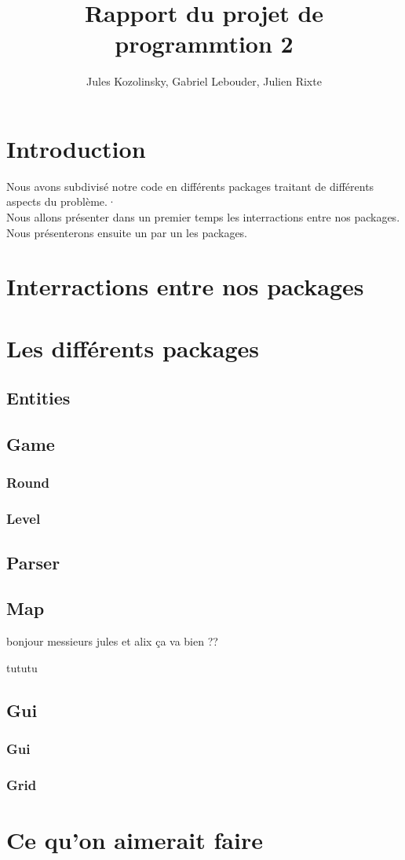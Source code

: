\documentclass{article}
\title{Rapport du projet de programmtion 2}
\author{Jules Kozolinsky, Gabriel Lebouder, Julien Rixte}
\begin{document}
\maketitle

\section{Introduction}

Nous avons subdivisé notre code en différents packages traitant de différents aspects du problème.·\\  Nous allons présenter dans un premier temps les interractions entre nos packages.\\  Nous présenterons ensuite un par un les packages.

\section{Interractions entre nos packages}

\section{Les différents packages}

\subsection{Entities}

\subsection{Game}
\subsubsection{Round}
\subsubsection{Level}

\subsection{Parser}

\subsection{Map}
bonjour
messieurs jules et alix ça va bien ??

tututu
\subsection{Gui}
\subsubsection{Gui}
\subsubsection{Grid}

\section{Ce qu'on aimerait faire}
\end{document}
